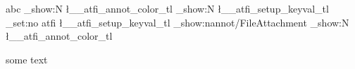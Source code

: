\documentclass{article}
\begin{document}
abc
\makeatletter 
{}
\ExplSyntaxOn
\tl_show:N \l__atfi_annot_color_tl
\tl_show:N \l__atfi_setup_keyval_tl
\keys_set:no {atfi} { \l__atfi_setup_keyval_tl }
\pdfdict_show:n{annot/FileAttachment}
\tl_show:N \l__atfi_annot_color_tl

\ExplSyntaxOff
{} some text
\atfi@acroPaperclip
\atfi@acroTag
\atfi@acroGraph
\atfi@acroPushPin

\ExplSyntaxOn
\ExplSyntaxOff
\end{document}
